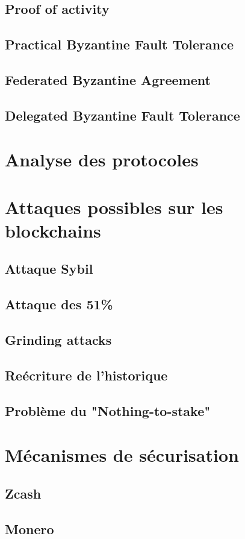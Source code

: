 \subsection{Proof of activity}

\subsection{Practical Byzantine Fault Tolerance}

\subsection{Federated Byzantine Agreement}

\subsection{Delegated Byzantine Fault Tolerance}

\section{Analyse des protocoles}

\section{Attaques possibles sur les blockchains}

\subsection{Attaque Sybil}
\subsection{Attaque des 51\%}
\subsection{Grinding attacks}
\subsection{Reécriture de l'historique}
\subsection{Problème du "Nothing-to-stake"}

\section{Mécanismes de sécurisation}

\subsection{Zcash}
\subsection{Monero}